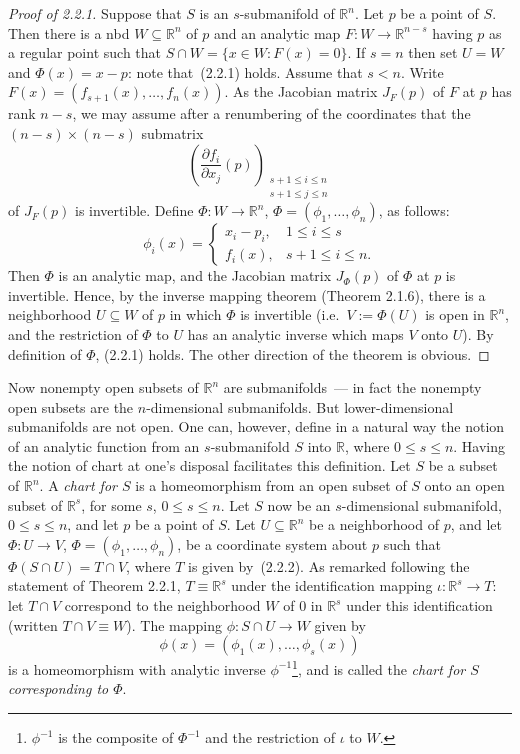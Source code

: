 \documentclass[11pt]{article}
\theoremstyle{plain}
\theoremstyle{definition}
\newcommand{\R}{\mathbb{R}}
\begin{document}
\begin{proof}[Proof of 2.2.1]
Suppose that $S$ is an $s$-submanifold of $\R^n$. Let $p$ be a point of
$S$. Then there is a nbd $W \subseteq \R^n$ of $p$ and an analytic map
$F: W \to \R^{n-s}$ having $p$ as a regular point such that
$S \cap W = \{ x \in W : F(x) = 0 \}$. If $s = n$ then set $U = W$ and
$\Phi(x) = x - p$: note that~(2.2.1) holds. Assume that $s < n$. Write
$F(x) = (f_{s+1}(x), \ldots, f_n(x))$. As the Jacobian matrix $J_F(p)$
of $F$ at $p$ has rank $n-s$, we may assume after a renumbering of the
coordinates that the $(n-s) \times (n-s)$ submatrix
\[
\left( \frac{\partial f_i}{\partial x_j}(p) \right)_{\substack{s+1 \le i \le n \\ s+1 \le j \le n}}
\]
of $J_F(p)$ is invertible. Define $\Phi: W \to \R^n$,
$\Phi = (\phi_1, \ldots, \phi_n)$, as follows:
\[
\phi_i(x) =
\begin{cases}
x_i - p_i, & 1 \le i \le s \\
f_i(x), & s+1 \le i \le n.
\end{cases}
\]
Then $\Phi$ is an analytic map, and the Jacobian matrix $J_\Phi(p)$ of
$\Phi$ at $p$ is invertible. Hence, by the inverse mapping theorem
(Theorem 2.1.6), there is a neighborhood $U \subseteq W$ of $p$ in which
$\Phi$ is invertible (i.e.\ $V := \Phi(U)$ is open in $\R^n$, and the
restriction of $\Phi$ to $U$ has an analytic inverse which maps $V$ onto
$U$). By definition of $\Phi$, (2.2.1) holds. The other direction of the
theorem is obvious.
\end{proof}

Now nonempty open subsets of $\R^n$ are submanifolds~--- in fact the
nonempty open subsets are the $n$-dimensional submanifolds. But
lower-dimensional submanifolds are not open. One can, however, define in
a natural way the notion of an analytic function from an $s$-submanifold
$S$ into $\R$, where $0 \le s \le n$. Having the notion of chart at
one's disposal facilitates this definition. Let $S$ be a subset of
$\R^n$. A \emph{chart for $S$} is a homeomorphism from an open subset of
$S$ onto an open subset of $\R^s$, for some $s$, $0 \le s \le n$. Let
$S$ now be an $s$-dimensional submanifold, $0 \le s \le n$, and let $p$
be a point of $S$. Let $U \subseteq \R^n$ be a neighborhood of $p$, and
let $\Phi: U \to V$, $\Phi = (\phi_1, \ldots, \phi_n)$, be a coordinate
system about $p$ such that $\Phi(S \cap U) = T \cap V$, where $T$ is
given by~(2.2.2). As remarked following the statement of Theorem 2.2.1,
$T \equiv \R^s$ under the identification mapping $\iota: \R^s \to T$:
let $T \cap V$ correspond to the neighborhood $W$ of $0$ in $\R^s$ under
this identification (written $T \cap V \equiv W$). The mapping
$\phi: S \cap U \to W$ given by
\[
\phi(x) = (\phi_1(x), \ldots, \phi_s(x))
\]
is a homeomorphism with analytic inverse $\phi^{-1}$\footnote{$\phi^{-1}$
is the composite of $\Phi^{-1}$ and the restriction of $\iota$ to $W$.},
and is called the \emph{chart for $S$ corresponding to $\Phi$}.
\end{document}
